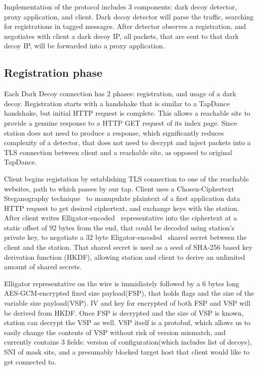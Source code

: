 \documentclass[letterpaper,twocolumn,10pt]{article}
\begin{document}
Implementation of the protocol includes 3 components:
dark decoy detector, proxy application, and client.
Dark decoy detector will parse the traffic, searching for registrations in
tagged messages. After detector observes a registration, and negotiates with client
a dark decoy IP,
all packets, that are sent to that dark decoy IP,
will be forwarded into a proxy application.

\subsection{Registration phase}

Each Dark Decoy connection has 2 phases: registration, and usage of a dark decoy.
Registration starts with a handshake that is similar to a TapDance handshake,
but initial HTTP request is complete.
This allows a reachable site to provide a genuine response
to a HTTP GET request of its index page.
Since station does not need to produce a response,
which significantly reduces complexity of a detector,
that does not need to decrypt and inject packets into a TLS connection between
client and a reachable site, as opposed to original TapDance.

Client begins registation by establishing TLS connection
to one of the reachable websites,
path to which passes by our tap.
Client uses a Chosen-Ciphertext Steganography technique~\cite{tapdance14} to manupulate
plaintext of a first application data HTTP request
to get desired ciphertext,
and exchange keys with the station.
After client writes Elligator-encoded~\cite{elligator} representative into the ciphertext at a static offset of 92 bytes from the end,
that could be decoded using station's private key,
to negotiate a 32 byte Eligator-encoded~\cite{elligator} shared secret between the client and the station.
That shared secret is used as a seed of SHA-256 based key derivation function (HKDF),
allowing station and client to derive an unlimited amount of shared secrets.

Elligator representative on the wire is immidiately followed by a 6 bytes long AES-GCM-encrypted
fixed size payload(FSP), that holds flags and the size of the variable size payload(VSP).
IV and key for encrypted of both FSP and VSP will be derived from HKDF.
Once FSP is decrypted and the size of VSP is known, station can decrypt the VSP as well.
VSP itself is a protobuf, which allows us to easily change the contents of VSP without risk of version mismatch, and currently contains 3 fields: version of configuration(which includes list of decoys), SNI of mask site, and a presumably blocked target host that client would like to get connected to.
\end{document}
